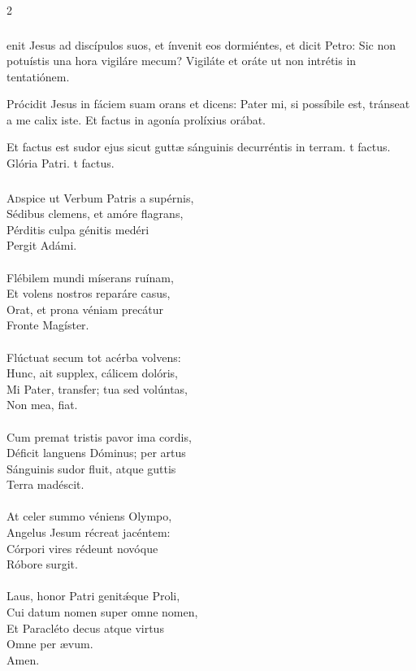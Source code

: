 \documentclass[9pt,twoside]{extarticle}
\begin{document}
\begin{multicols}{2}
\subsubsection*{}
enit Jesus ad discípulos suos, et ínvenit eos dormiéntes, et dicit Petro: Sic non potuístis una hora vigiláre mecum? Vigiláte et oráte ut non intrétis in tentatiónem.

\begin{tightlist}{}
\item {} Prócidit Jesus in fáciem suam orans et dicens: Pater mi, si possíbile est, tránseat a me calix iste. \textred{*} Et factus in agonía prolíxius orábat. 
\item {} Et factus est sudor ejus sicut guttæ sánguinis decurréntis in terram. t factus. Glória Patri. t factus. 
\end{tightlist}

\subsubsection*{\center{}}
\lettrine{A}dspice ut Verbum Patris a supérnis,\\ Sédibus clemens, et amóre flagrans,\\ Pérditis culpa génitis medéri\\ Pergit Adámi.\\
\\
Flébilem mundi míserans ruínam,\\ Et volens nostros reparáre casus,\\ Orat, et prona véniam precátur\\ Fronte Magíster.\\
\\
Flúctuat secum tot acérba volvens:\\ Hunc, ait supplex, cálicem dolóris,\\ Mi Pater, transfer; tua sed volúntas,\\ Non mea, fiat.\\
\\
Cum premat tristis pavor ima cordis,\\ Déficit languens Dóminus; per artus\\ Sánguinis sudor fluit, atque guttis\\ Terra madéscit.\\
\\
At celer summo véniens Olympo,\\ Angelus Jesum récreat jacéntem:\\ Córpori vires rédeunt novóque\\ Róbore surgit.\\
\\
Laus, honor Patri genitǽque Proli,\\ Cui datum nomen super omne nomen,\\ Et Paracléto decus atque virtus\\ Omne per ævum.\\
Amen.


\end{multicols}
\end{document}
